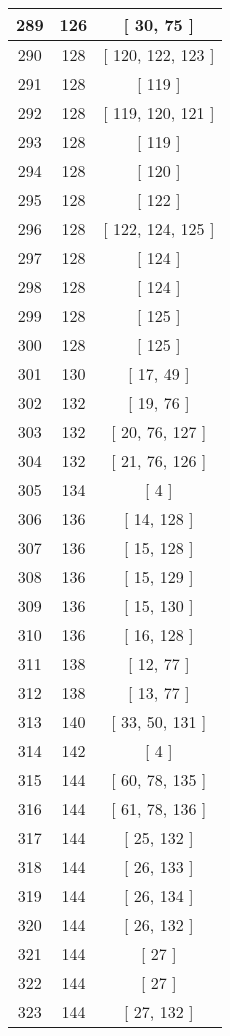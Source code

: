 \begin{center}
\begin{longtable}[H]{|| c c c ||}
\hline
289 & 126 & [ 30, 75 ] \\ 
\hline
290 & 128 & [ 120, 122, 123 ] \\ 
\hline
291 & 128 & [ 119 ] \\ 
\hline
292 & 128 & [ 119, 120, 121 ] \\ 
\hline
293 & 128 & [ 119 ] \\ 
\hline
294 & 128 & [ 120 ] \\ 
\hline
295 & 128 & [ 122 ] \\ 
\hline
296 & 128 & [ 122, 124, 125 ] \\ 
\hline
297 & 128 & [ 124 ] \\ 
\hline
298 & 128 & [ 124 ] \\ 
\hline
299 & 128 & [ 125 ] \\ 
\hline
300 & 128 & [ 125 ] \\ 
\hline
301 & 130 & [ 17, 49 ] \\ 
\hline
302 & 132 & [ 19, 76 ] \\ 
\hline
303 & 132 & [ 20, 76, 127 ] \\ 
\hline
304 & 132 & [ 21, 76, 126 ] \\ 
\hline
305 & 134 & [ 4 ] \\ 
\hline
306 & 136 & [ 14, 128 ] \\ 
\hline
307 & 136 & [ 15, 128 ] \\ 
\hline
308 & 136 & [ 15, 129 ] \\ 
\hline
309 & 136 & [ 15, 130 ] \\ 
\hline
310 & 136 & [ 16, 128 ] \\ 
\hline
311 & 138 & [ 12, 77 ] \\ 
\hline
312 & 138 & [ 13, 77 ] \\ 
\hline
313 & 140 & [ 33, 50, 131 ] \\ 
\hline
314 & 142 & [ 4 ] \\ 
\hline
315 & 144 & [ 60, 78, 135 ] \\ 
\hline
316 & 144 & [ 61, 78, 136 ] \\ 
\hline
317 & 144 & [ 25, 132 ] \\ 
\hline
318 & 144 & [ 26, 133 ] \\ 
\hline
319 & 144 & [ 26, 134 ] \\ 
\hline
320 & 144 & [ 26, 132 ] \\ 
\hline
321 & 144 & [ 27 ] \\ 
\hline
322 & 144 & [ 27 ] \\ 
\hline
323 & 144 & [ 27, 132 ] \\ 

\end{longtable}
\end{center}
